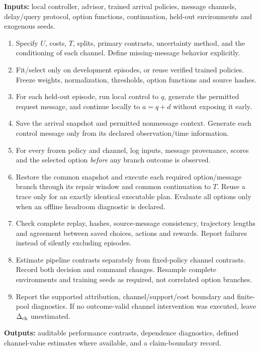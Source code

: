 \begin{algorithm}[tb]
\caption{Delayed-Advice Audit Procedure}\label{alg:audit}
\small
\textbf{Inputs:} local controller, advisor, trained arrival policies, message channels, delay/query protocol, option functions, continuation, held-out environments and exogenous seeds.\par
\begin{enumerate}
\item Specify $U$, costs, $T$, splits, primary contrasts, uncertainty method, and the conditioning of each channel. Define missing-message behavior explicitly.
\item Fit/select only on development episodes, or reuse verified trained policies. Freeze weights, normalization, thresholds, option functions and source hashes.
\item For each held-out episode, run local control to $q$, generate the permitted request message, and continue locally to $a=q+d$ without exposing it early.
\item Save the arrival snapshot and permitted nonmessage context. Generate each control message only from its declared observation/time information.
\item For every frozen policy and channel, log inputs, message provenance, scores and the selected option \emph{before} any branch outcome is observed.
\item Restore the common snapshot and execute each required option/message branch through its repair window and common continuation to $T$. Reuse a trace only for an exactly identical executable plan. Evaluate all options only when an offline headroom diagnostic is declared.
\item Check complete replay, hashes, source-message consistency, trajectory lengths and agreement between saved choices, actions and rewards. Report failures instead of silently excluding episodes.
\item Estimate pipeline contrasts separately from fixed-policy channel contrasts. Record both decision and command changes. Resample complete environments and training seeds as required, not correlated option branches.
\item Report the supported attribution, channel/support/cost boundary and finite-pool diagnostics. If no outcome-valid channel intervention was executed, leave $\Delta_{\rm ch}$ unestimated.
\end{enumerate}
\textbf{Outputs:} auditable performance contrasts, dependence diagnostics, defined channel-value estimates where available, and a claim-boundary record.
\end{algorithm}

